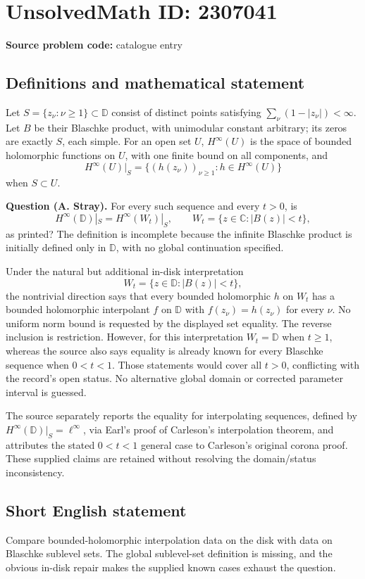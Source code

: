 \documentclass[11pt]{article}
\begin{document}
\section*{UnsolvedMath ID: 2307041}
\textbf{Source problem code:} catalogue entry
\subsection{Definitions and mathematical statement}
Let $S=\{z_\nu:\nu\geq1\}\subset\mathbb D$ consist of distinct points satisfying $\sum_\nu(1-|z_\nu|)<\infty$. Let $B$ be their Blaschke product, with unimodular constant arbitrary; its zeros are exactly $S$, each simple. For an open set $U$, $H^\infty(U)$ is the space of bounded holomorphic functions on $U$, with one finite bound on all components, and
\[
H^\infty(U)|_S=\{(h(z_\nu))_{\nu\geq1}:h\in H^\infty(U)\}
\]
when $S\subset U$.

\textbf{Question (A. Stray).} For every such sequence and every $t>0$, is
\[
H^\infty(\mathbb D)|_S=H^\infty(W_t)|_S,
\qquad W_t=\{z\in\mathbb C:|B(z)|<t\},
\]
as printed? The definition is incomplete because the infinite Blaschke product is initially defined only in $\mathbb D$, with no global continuation specified.

Under the natural but additional in-disk interpretation
\[
W_t=\{z\in\mathbb D:|B(z)|<t\},
\]
the nontrivial direction says that every bounded holomorphic $h$ on $W_t$ has a bounded holomorphic interpolant $f$ on $\mathbb D$ with $f(z_\nu)=h(z_\nu)$ for every $\nu$. No uniform norm bound is requested by the displayed set equality. The reverse inclusion is restriction. However, for this interpretation $W_t=\mathbb D$ when $t\geq1$, whereas the source also says equality is already known for every Blaschke sequence when $0<t<1$. Those statements would cover all $t>0$, conflicting with the record's open status. No alternative global domain or corrected parameter interval is guessed.

The source separately reports the equality for interpolating sequences, defined by $H^\infty(\mathbb D)|_S=\ell^\infty$, via Earl's proof of Carleson's interpolation theorem, and attributes the stated $0<t<1$ general case to Carleson's original corona proof. These supplied claims are retained without resolving the domain/status inconsistency.
\subsection{Short English statement}
Compare bounded-holomorphic interpolation data on the disk with data on Blaschke sublevel sets. The global sublevel-set definition is missing, and the obvious in-disk repair makes the supplied known cases exhaust the question.
\end{document}
